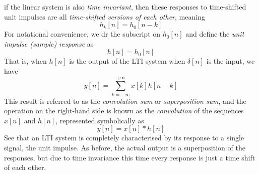 \documentclass{report}
\begin{document}
if the linear system is also \textit{time invariant}, then these responses to time-shifted unit impulses are all 
\textit{time-shifted versions of each other}, meaning
\begin{equation*}
h_k[n]=h_0[n-k]
\end{equation*}
For notational convenience, we dr the subscript on $h_0[n]$ and define the \textit{unit impulse (sample) response} as 
\begin{equation*}
h[n]=h_0[n]
\end{equation*}
That is, when $h[n]$ is the output of the LTI system when $\delta[n]$ is the input, we have
\begin{equation*}
y[n]=\sum^{+\infty}_{k=-\infty}x[k]h[n-k]
\end{equation*}
This result is referred to as the \textit{convolution sum} or \textit{superposition sum}, and the operation on the right-hand
side is known as the \textit{convolution} of the sequences
$x[n]$ and $h[n]$, represented symbolically as
\begin{equation*}
y[n]=x[n]*h[n]
\end{equation*}
See that an LTI system is completely characterised by its response to a single signal, the unit impulse. As before, the actual
output is a superposition of the responses, but due to time invariance this time 
every response is just a time shift of each other.
\newpage
\end{document}
